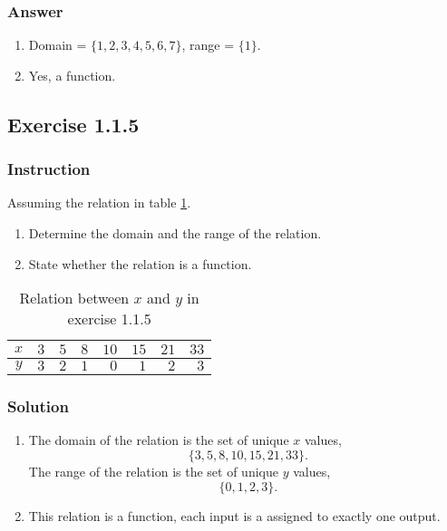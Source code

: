 \documentclass[11pt, letterpaper, oneside]{memoir}
\begin{document}
\subsubsection{Answer}

\begin{enumerate}[label=(\alph*)]
  \item Domain = $  \{ 1, 2, 3, 4, 5, 6, 7 \} $, range = $ \{ 1 \} $.
  \item Yes, a function.
\end{enumerate}

\subsection*{Exercise 1.1.5}

\subsubsection{Instruction}

Assuming the relation in table \ref{table:exercise-1.1.5}.
\begin{enumerate}[label=(\alph*)]
  \item Determine the domain and the range of the relation.
  \item State whether the relation is a function.
\end{enumerate}

\begin{table}[ht]
  \centering
  \begin{tabular}{ c | r r r r r r r }
    \hline
    $ x $ & $ 3 $ & $ 5 $ & $ 8 $ & $ 10 $ & $ 15 $ & $ 21 $ & $ 33 $ \\
    \hline
    $ y $ & $ 3 $ & $ 2 $ & $ 1 $ & $ 0 $ & $ 1 $ & $ 2 $ & $ 3 $ \\
    \hline
  \end{tabular}
  \caption{Relation between $ x $ and $ y $ in exercise 1.1.5}
  \label{table:exercise-1.1.5}
\end{table}

\subsubsection{Solution}

\begin{enumerate}[label=(\alph*)]
  \item The domain of the relation is the set of unique $ x $ values,
    $$ \phantom{.}
    \{ 3, 5, 8, 10, 15, 21, 33 \}
    .$$
    The range of the relation is the set of unique $ y $ values,
    $$ \phantom{.}
    \{ 0, 1, 2, 3\}
    .$$
  \item This relation is a function, each input is a assigned to exactly one output.
\end{enumerate}
\end{document}

